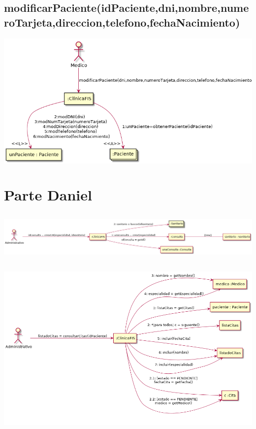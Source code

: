 \documentclass[10pt,a4paper,spanish]{report}
\begin{document}
\subsection*{modificarPaciente(idPaciente,dni,nombre,numeroTarjeta,direccion,telefono,fechaNacimiento)}
\begin{center}
	\includegraphics[scale=0.4]{dl2.png}
\end{center}

\section*{Parte Daniel}
\subsection*{}
\begin{center}
	\includegraphics[scale=0.3]{crearCM.png}
\end{center}
\subsection*{}
\begin{center}
	\includegraphics[scale=0.4]{consultarCitas.png}
\end{center}
\end{document}
